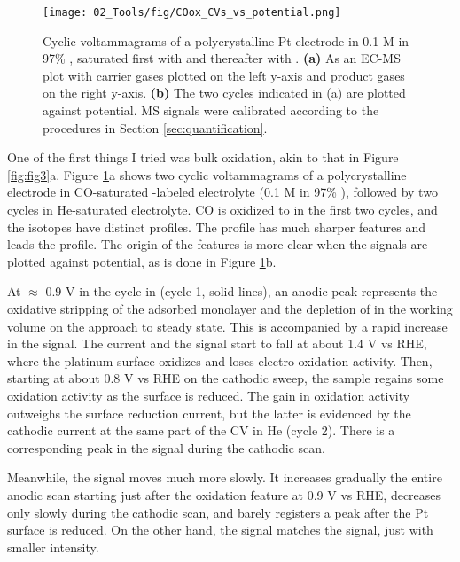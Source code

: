 \begin{figure}[t]
	\centering
	\texttt{[image: 02\_Tools/fig/COox\_CVs\_vs\_potential.png]}
	\caption{Cyclic voltammagrams of a polycrystalline Pt electrode in 0.1 M  in 97\% , saturated first with  and thereafter with . \textbf{(a)} As an EC-MS plot with carrier gases plotted on the left y-axis and product gases on the right y-axis. \textbf{(b)} The two cycles indicated in (a) are plotted against potential. MS signals were calibrated according to the procedures in Section \ref{sec:quantification}.}
	\label{fig:COox_CVs}
\end{figure}
One of the first things I tried was bulk  oxidation, akin to that in Figure \ref{fig:fig3}a. Figure \ref{fig:COox_CVs}a shows two cyclic voltammagrams of a polycrystalline  electrode in CO-saturated -labeled electrolyte (0.1 M  in 97\% ), followed by two cycles in He-saturated electrolyte. CO is oxidized to  in the first two cycles, and the  isotopes have distinct profiles. The  profile has much sharper features and leads the  profile. The origin of the features is more clear when the  signals are plotted against potential, as is done in Figure \ref{fig:COox_CVs}b. 

At $\approx$ 0.9 V in the cycle in  (cycle 1, solid lines), an anodic peak represents the oxidative stripping of the adsorbed  monolayer and the depletion of  in the working volume on the approach to steady state. This is accompanied by a rapid increase in the  signal. The current and the  signal start to fall at about 1.4 V vs RHE, where the platinum surface oxidizes and loses  electro-oxidation activity. Then, starting at about 0.8 V vs RHE on the cathodic sweep, the sample regains some  oxidation activity as the surface is reduced. The gain in  oxidation activity outweighs the surface reduction current, but the latter is evidenced by the cathodic current at the same part of the CV in He (cycle 2). There is a corresponding peak in the  signal during the cathodic scan. 

Meanwhile, the  signal moves much more slowly. It increases gradually the entire anodic scan starting just after the oxidation feature at 0.9 V vs RHE, decreases only slowly during the cathodic scan, and barely registers a peak after the Pt surface is reduced. On the other hand, the  signal matches the  signal, just with smaller intensity.

